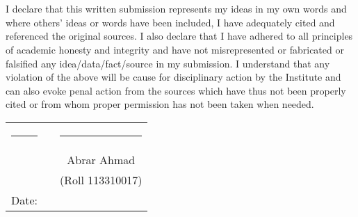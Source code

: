 \chapter*{}

I declare that this written submission represents my ideas in my own words
and where others' ideas or words have been included, I have adequately cited
and referenced the original sources. I also declare that I have adhered to all
principles of academic honesty and integrity and have not misrepresented or
fabricated or falsified any idea/data/fact/source in my submission. I
understand that any violation of the above will be cause for disciplinary
action by the Institute and can also evoke penal action from the sources which
have thus not been properly cited or from whom proper permission has not been
taken when needed.

\vspace{1.5cm}

\begin{tabular}{llc}
\rule{40mm}{0pt}        & \rule{50mm}{0pt}       & \rule{55mm}{0pt} \\
                        &                        & Abrar Ahmad \\
                        &                        & (Roll 113310017)\\
Date:\dotfill           &                        & \\
\end{tabular}